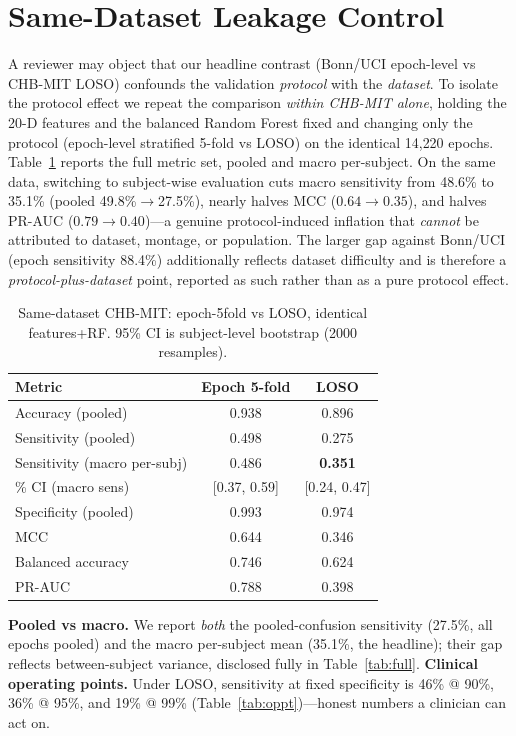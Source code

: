\documentclass[10pt,journal,twocolumn]{IEEEtran}
\begin{document}
\section{Same-Dataset Leakage Control}\label{sec:samedataset}
A reviewer may object that our headline contrast (Bonn/UCI epoch-level vs CHB-MIT LOSO) confounds the validation \emph{protocol} with the \emph{dataset}. To isolate the protocol effect we repeat the comparison \emph{within CHB-MIT alone}, holding the 20-D features and the balanced Random Forest fixed and changing only the protocol (epoch-level stratified 5-fold vs LOSO) on the identical 14{,}220 epochs. Table~\ref{tab:samed} reports the full metric set, pooled and macro per-subject. On the same data, switching to subject-wise evaluation cuts macro sensitivity from 48.6\% to 35.1\% (pooled 49.8\%$\rightarrow$27.5\%), nearly halves MCC ($0.64\rightarrow0.35$), and halves PR-AUC ($0.79\rightarrow0.40$)---a genuine protocol-induced inflation that \emph{cannot} be attributed to dataset, montage, or population. The larger gap against Bonn/UCI (epoch sensitivity 88.4\%) additionally reflects dataset difficulty and is therefore a \emph{protocol-plus-dataset} point, reported as such rather than as a pure protocol effect.
\begin{table}[h]\centering\caption{Same-dataset CHB-MIT: epoch-5fold vs LOSO, identical features+RF. 95\% CI is subject-level bootstrap (2000 resamples).}\label{tab:samed}
\begin{tabular}{lcc}\toprule
Metric & Epoch 5-fold & LOSO\\\midrule
Accuracy (pooled) & 0.938 & 0.896\\
Sensitivity (pooled) & 0.498 & 0.275\\
Sensitivity (macro per-subj) & 0.486 & \textbf{0.351}\\
\;\;95\% CI (macro sens) & [0.37, 0.59] & [0.24, 0.47]\\
Specificity (pooled) & 0.993 & 0.974\\
MCC & 0.644 & 0.346\\
Balanced accuracy & 0.746 & 0.624\\
PR-AUC & 0.788 & 0.398\\\bottomrule
\end{tabular}\end{table}
\textbf{Pooled vs macro.} We report \emph{both} the pooled-confusion sensitivity (27.5\%, all epochs pooled) and the macro per-subject mean (35.1\%, the headline); their gap reflects between-subject variance, disclosed fully in Table~\ref{tab:full}. \textbf{Clinical operating points.} Under LOSO, sensitivity at fixed specificity is 46\% @ 90\%, 36\% @ 95\%, and 19\% @ 99\% (Table~\ref{tab:oppt})---honest numbers a clinician can act on.
\end{document}
